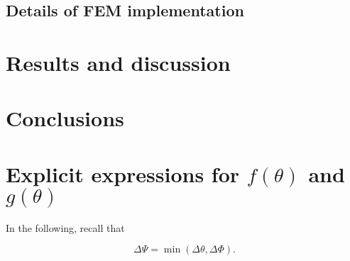\documentclass[review]{elsarticle}
\begin{document}
\subsection{Details of FEM implementation}

\section{Results and discussion}

\section{Conclusions}



\appendix
\section{Explicit expressions for $f\left(\theta\right)$ and $g\left(\theta\right)$}\label{app:fandgexplicit}

In the following, recall that

\begin{equation}
\Delta\Psi=\min\left(\Delta\theta,\Delta\Phi\right).
\end{equation}
\end{document}

